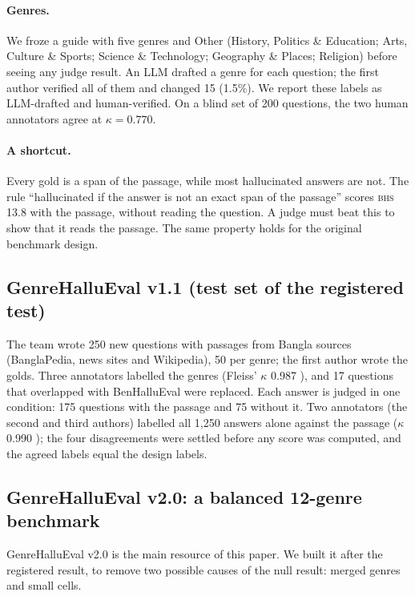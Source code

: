 \documentclass[11pt]{article}
\newcommand{\BHS}{\textsc{bhs}}
\begin{document}
\paragraph{Genres.} We froze a guide with five genres and Other (History, Politics \& Education; Arts, Culture \&
Sports; Science \& Technology; Geography \& Places; Religion) before seeing any judge result. An LLM drafted a genre
for each question; the first author verified all of them and changed 15 (1.5\%). We report these labels as
LLM-drafted and human-verified. On a blind set of 200 questions, the two human annotators agree at $\kappa=0.770$.

\paragraph{A shortcut.} Every gold is a span of the passage, while most hallucinated answers are not. The rule
``hallucinated if the answer is not an exact span of the passage'' scores \BHS{} 13.8 with the passage, without
reading the question. A judge must beat this to show that it reads the passage. The same property holds for the
original benchmark design.

\subsection{GenreHalluEval v1.1 (test set of the registered test)}

The team wrote 250 new questions with passages from Bangla sources (BanglaPedia, news sites and Wikipedia), 50 per
genre; the first author wrote the golds. Three annotators labelled the genres (Fleiss' $\kappa$ 0.987 \citep{fleiss1971}),
and 17 questions that overlapped with BenHalluEval were replaced. Each answer is judged in one condition: 175 questions
with the passage and 75 without it. Two annotators (the second and third authors) labelled all 1,250 answers alone
against the passage ($\kappa$ 0.990 \citep{cohen1960}); the four disagreements were settled before any score was
computed, and the agreed labels equal the design labels.

\subsection{GenreHalluEval v2.0: a balanced 12-genre benchmark}\label{sec:v2}

GenreHalluEval v2.0 is the main resource of this paper. We built it after the registered result, to remove two
possible causes of the null result: merged genres and small cells.
\end{document}
